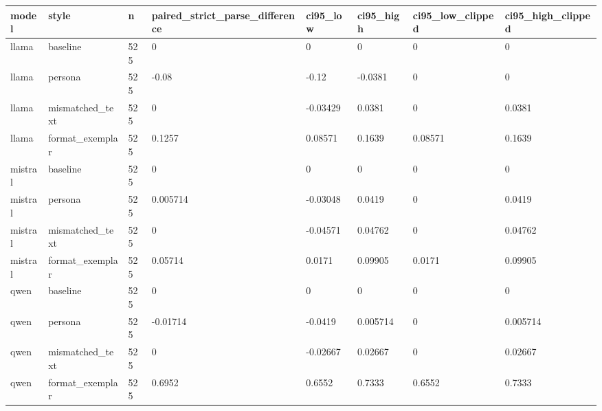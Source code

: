 \begin{tabular}{llllllll}
\toprule
model & style & n & paired\_strict\_parse\_difference & ci95\_low & ci95\_high & ci95\_low\_clipped & ci95\_high\_clipped \\
\midrule
llama & baseline & 525 & 0 & 0 & 0 & 0 & 0 \\
llama & persona & 525 & -0.08 & -0.12 & -0.0381 & 0 & 0 \\
llama & mismatched\_text & 525 & 0 & -0.03429 & 0.0381 & 0 & 0.0381 \\
llama & format\_exemplar & 525 & 0.1257 & 0.08571 & 0.1639 & 0.08571 & 0.1639 \\
mistral & baseline & 525 & 0 & 0 & 0 & 0 & 0 \\
mistral & persona & 525 & 0.005714 & -0.03048 & 0.0419 & 0 & 0.0419 \\
mistral & mismatched\_text & 525 & 0 & -0.04571 & 0.04762 & 0 & 0.04762 \\
mistral & format\_exemplar & 525 & 0.05714 & 0.0171 & 0.09905 & 0.0171 & 0.09905 \\
qwen & baseline & 525 & 0 & 0 & 0 & 0 & 0 \\
qwen & persona & 525 & -0.01714 & -0.0419 & 0.005714 & 0 & 0.005714 \\
qwen & mismatched\_text & 525 & 0 & -0.02667 & 0.02667 & 0 & 0.02667 \\
qwen & format\_exemplar & 525 & 0.6952 & 0.6552 & 0.7333 & 0.6552 & 0.7333 \\
\bottomrule
\end{tabular}
